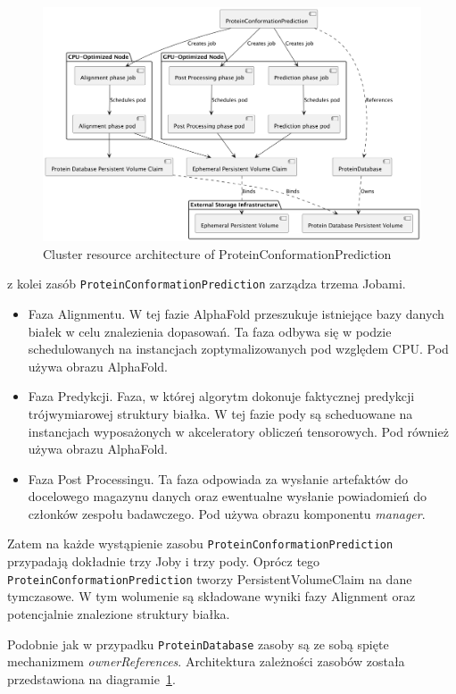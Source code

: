 \begin{figure}[htbp]
    \centering
    \includegraphics[width=\textwidth]{images/proteinconformationprediction}
    \caption{Cluster resource architecture of ProteinConformationPrediction}
    \label{fig:proteinconformationprediction}
\end{figure}

z kolei zasób \texttt{ProteinConformationPrediction} zarządza trzema Jobami.
\begin{itemize}
    \item Faza Alignmentu.
    W tej fazie AlphaFold przeszukuje istniejące bazy danych białek w celu znalezienia dopasowań.
    Ta faza odbywa się w podzie schedulowanych na instancjach zoptymalizowanych pod względem CPU. Pod używa obrazu AlphaFold.
    \item Faza Predykcji.
    Faza, w której algorytm dokonuje faktycznej predykcji trójwymiarowej struktury białka.
    W tej fazie pody są scheduowane na instancjach wyposażonych w akceleratory obliczeń tensorowych.
    Pod również używa obrazu AlphaFold.
    \item Faza Post Processingu.
    Ta faza odpowiada za wysłanie artefaktów do docelowego magazynu danych oraz ewentualne wysłanie powiadomień do członków zespołu badawczego.
    Pod używa obrazu komponentu \textit{manager}.
\end{itemize}

Zatem na każde wystąpienie zasobu \texttt{ProteinConformationPrediction} przypadają dokładnie trzy Joby i trzy pody.
Oprócz tego \texttt{ProteinConformationPrediction} tworzy PersistentVolumeClaim na dane tymczasowe.
W tym wolumenie są składowane wyniki fazy Alignment oraz potencjalnie znalezione struktury białka.

Podobnie jak w przypadku \texttt{ProteinDatabase} zasoby są ze sobą spięte mechanizmem \textit{ownerReferences}.
Architektura zależności zasobów została przedstawiona na diagramie~\ref{fig:proteinconformationprediction}.


